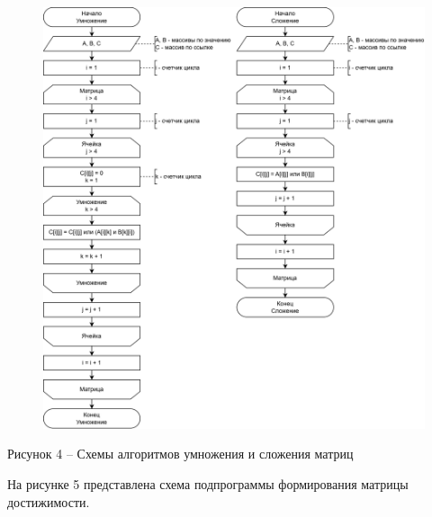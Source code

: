 \documentclass[a4paper,14pt]{extarticle}
\begin{document}
  \begin{figure}[h]
    \centering
    \includegraphics[width=1\linewidth]{images/s-3.png}
  \end{figure}
  \begin{center}
    Рисунок 4 – Схемы алгоритмов умножения и сложения матриц
  \end{center}

  \pagebreak
  На рисунке 5 представлена схема подпрограммы формирования матрицы достижимости.
\end{document}
